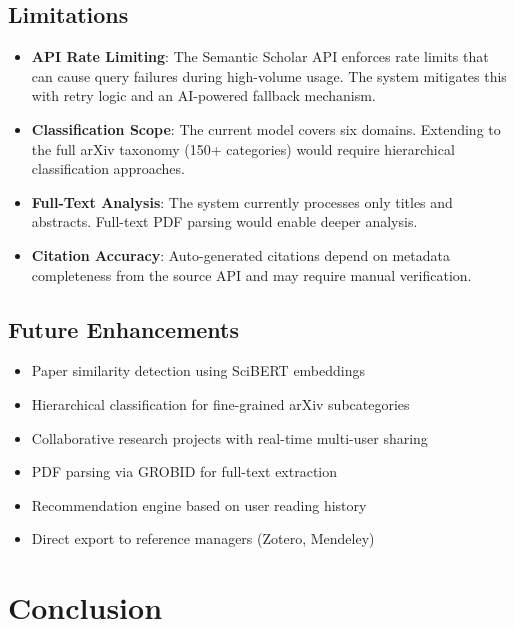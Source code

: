 \documentclass[conference]{IEEEtran}
\begin{document}
\subsection{Limitations}

\begin{itemize}
    \item \textbf{API Rate Limiting}: The Semantic Scholar API enforces rate limits that can cause query failures during high-volume usage. The system mitigates this with retry logic and an AI-powered fallback mechanism.
    \item \textbf{Classification Scope}: The current model covers six domains. Extending to the full arXiv taxonomy (150+ categories) would require hierarchical classification approaches.
    \item \textbf{Full-Text Analysis}: The system currently processes only titles and abstracts. Full-text PDF parsing would enable deeper analysis.
    \item \textbf{Citation Accuracy}: Auto-generated citations depend on metadata completeness from the source API and may require manual verification.
\end{itemize}

\subsection{Future Enhancements}

\begin{itemize}
    \item Paper similarity detection using SciBERT \cite{scibert} embeddings
    \item Hierarchical classification for fine-grained arXiv subcategories
    \item Collaborative research projects with real-time multi-user sharing
    \item PDF parsing via GROBID \cite{grobid} for full-text extraction
    \item Recommendation engine based on user reading history
    \item Direct export to reference managers (Zotero, Mendeley)
\end{itemize}

\section{Conclusion}
\end{document}
